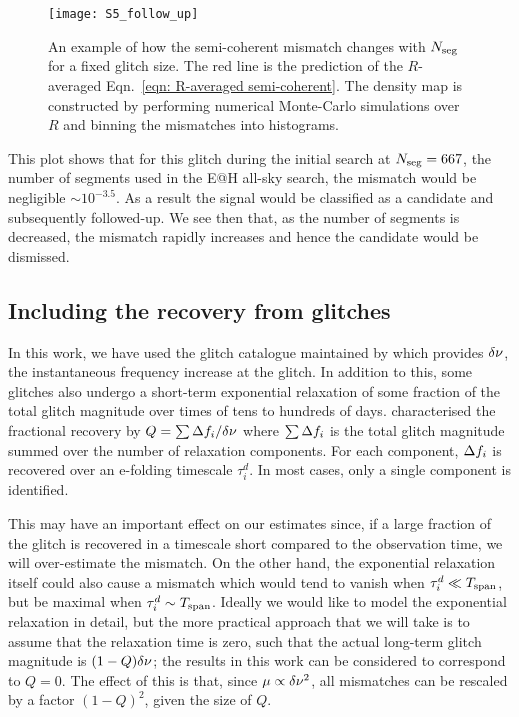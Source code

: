 \documentclass[../full_thesis/full_thesis.tex]{subfiles}
\begin{document}
\begin{figure}[htb]
\centering
\texttt{[image: S5\_follow\_up]}
\caption{An example of how the semi-coherent mismatch changes with $N_{\textrm{seg}}$ for
         a fixed glitch size. The red line is the prediction of the $R$-averaged
         Eqn.~\eqref{eqn: R-averaged semi-coherent}. The density map is constructed
         by performing numerical Monte-Carlo simulations over $R$ and binning the mismatches
         into histograms.}
\label{fig: follow-up}
\end{figure}
This plot shows that for this glitch during the initial search at $N_{\textrm{seg}}=667$,
the number of segments used in the E@H all-sky search, the mismatch would be
negligible $\sim10^{-3.5}$. As a result the signal would be classified as a
candidate and subsequently followed-up. We see then that, as the number of
segments is decreased, the mismatch rapidly increases and hence the candidate
would be dismissed.

\subsection{Including the recovery from glitches}
\label{sec: recovery}
In this work, we have used the glitch catalogue maintained by \citet{Espinoza2011}
which provides $\delta\nu$, the instantaneous frequency increase at the
glitch. In addition to this, some glitches also undergo a short-term
exponential relaxation of some fraction of the total glitch magnitude over
times of tens to hundreds of days. \citet{Lyne2000} characterised the
fractional recovery by $Q = \sum \Delta f_i/\delta\nu$ where $\sum
\Delta f_i$ is the total glitch magnitude summed over the number of relaxation
components. For each component, $\Delta f_i$ is recovered over an
e-folding timescale $\tau^d_i$. In most cases, only a single component is
identified.

This may have an important effect on our estimates since, if a large fraction
of the glitch is recovered in a timescale short compared to the observation
time, we will over-estimate the mismatch. On the other hand, the exponential
relaxation itself could also cause a mismatch which would tend to vanish when
$\tau^d_i \ll T_{\mathrm{span}}$, but be maximal when $\tau^d_i \sim T_{\mathrm{span}}$.  Ideally we would
like to model the exponential relaxation in detail, but the more practical
approach that we will take is to assume that the relaxation time is zero, such
that the actual long-term glitch magnitude is $(1-Q)\delta\nu$; the results in
this work can be considered to correspond to $Q=0$. The effect of this is that,
since $\mu \propto \delta\nu^2$, all mismatches can be rescaled by a factor
$(1-Q)^{2}$, given the size of $Q$.
\end{document}
